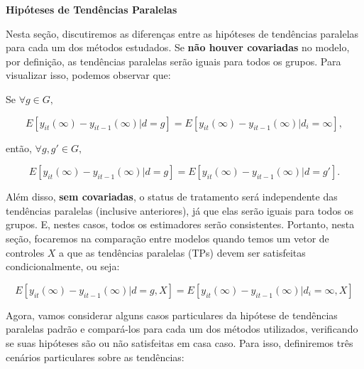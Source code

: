 \documentclass[portugues]{article}
\begin{document}
\textbf{Hipóteses de Tendências Paralelas}

\vspace{2.5mm}

Nesta seção, discutiremos as diferenças entre as hipóteses de tendências paralelas para cada um dos métodos estudados. Se \textbf{não houver covariadas} no modelo, por definição, as tendências paralelas serão iguais para todos os grupos. Para visualizar isso, podemos observar que:

Se $\forall g \in G,$
    
$$ 
E[y_{it}(\infty) - y_{it-1}(\infty) | d=g] = E[y_{it}(\infty) - y_{it-1}(\infty) | d_i = \infty], 
$$

então, $\forall g,g' \in G,$

$$  
E[y_{it}(\infty) - y_{it-1}(\infty) | d=g] = E[y_{it}(\infty) - y_{it-1}(\infty) | d=g']. 
$$

Além disso, \textbf{sem covariadas}, o status de tratamento será independente das tendências paralelas (inclusive anteriores), já que elas serão iguais para todos os grupos. E, nestes casos, todos os estimadores serão consistentes. Portanto, nesta seção, focaremos na comparação entre modelos quando temos um vetor de controles $X$ a que as tendências paralelas (TPs) devem ser satisfeitas condicionalmente, ou seja:

$$ 
E[y_{it}(\infty)- y_{it-1}(\infty) | d=g, X] = E[y_{it}(\infty) - y_{it-1}(\infty) | d_i = \infty, X] 
$$

Agora, vamos considerar alguns casos particulares da hipótese de tendências paralelas padrão e compará-los para cada um dos métodos utilizados, verificando se suas hipóteses são ou não satisfeitas em casa caso. Para isso, definiremos três cenários particulares sobre as tendências:
\end{document}
